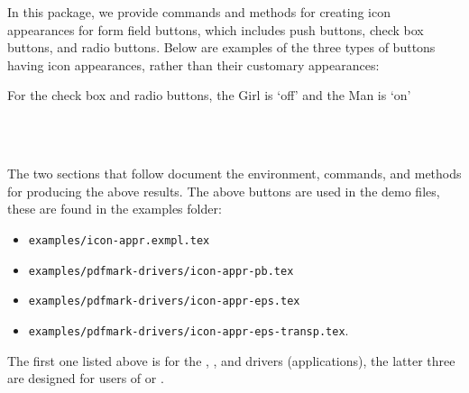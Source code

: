 \documentclass{article}
\begin{document}
In this package, we provide commands and methods for creating icon
appearances for form field buttons, which includes push buttons, check box
buttons, and radio buttons. Below are examples of the three types of buttons
having icon appearances, rather than their customary appearances:
\begin{flushleft}
\hskip15pt
\qquad
%
\qquad %
%
\quad
{}\quad
{}\qquad %
%
\hfill
\parbox{1.5in}{\footnotesize For the check box and radio buttons, the Girl is `off'
and the Man is `on'}%
\\[3pt]
\bgroup{}\relax\footnotesize
{}\qquad
{}\qquad
{}\\[3pt]
\makebox[52bp][c]{\hfill}\qquad
\egroup
\end{flushleft}
The two sections that follow document the environment, commands, and methods for producing the
above results. The above buttons are used in the demo files, these are found in the
\textsf{examples} folder:
\begin{itemize}
\item \texttt{examples/icon-appr.exmpl.tex}
\item \texttt{examples/pdfmark-drivers/icon-appr-pb.tex}
\item \texttt{examples/pdfmark-drivers/icon-appr-eps.tex}
\item \texttt{examples/pdfmark-drivers/icon-appr-eps-transp.tex}.
\end{itemize}
The first one listed above is for the , , and
 drivers (applications), the latter three are designed for users
of  or .
\end{document}
